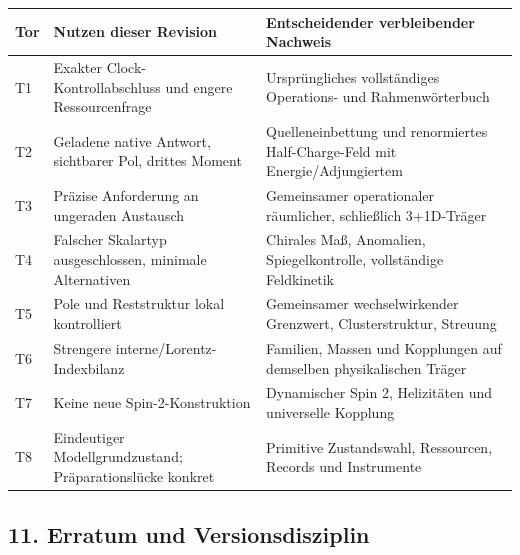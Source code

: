 {\def\LTcaptype{none} %
\begin{longtable}[]{@{}
  >{\raggedright\arraybackslash}p{}
  >{\raggedright\arraybackslash}p{}
  >{\raggedright\arraybackslash}p{}@{}}
\toprule\noalign{}
\begin{minipage}[b]{\linewidth}\raggedright
Tor
\end{minipage} & \begin{minipage}[b]{\linewidth}\raggedright
Nutzen dieser Revision
\end{minipage} & \begin{minipage}[b]{\linewidth}\raggedright
Entscheidender verbleibender Nachweis
\end{minipage} \\
\midrule\noalign{}
\endhead
\bottomrule\noalign{}
\endlastfoot
T1 & Exakter Clock-Kontrollabschluss und engere Ressourcenfrage &
Ursprüngliches vollständiges Operations- und Rahmenwörterbuch \\
T2 & Geladene native Antwort, sichtbarer Pol, drittes Moment &
Quelleneinbettung und renormiertes Half-Charge-Feld mit
Energie/Adjungiertem \\
T3 & Präzise Anforderung an ungeraden Austausch & Gemeinsamer
operationaler räumlicher, schließlich 3+1D-Träger \\
T4 & Falscher Skalartyp ausgeschlossen, minimale Alternativen & Chirales
Maß, Anomalien, Spiegelkontrolle, vollständige Feldkinetik \\
T5 & Pole und Reststruktur lokal kontrolliert & Gemeinsamer
wechselwirkender Grenzwert, Clusterstruktur, Streuung \\
T6 & Strengere interne/Lorentz-Indexbilanz & Familien, Massen und
Kopplungen auf demselben physikalischen Träger \\
T7 & Keine neue Spin-2-Konstruktion & Dynamischer Spin 2, Helizitäten
und universelle Kopplung \\
T8 & Eindeutiger Modellgrundzustand; Präparationslücke konkret &
Primitive Zustandswahl, Ressourcen, Records und Instrumente \\
\end{longtable}
}

\subsection{11. Erratum und
Versionsdisziplin}\label{erratum-und-versionsdisziplin}

